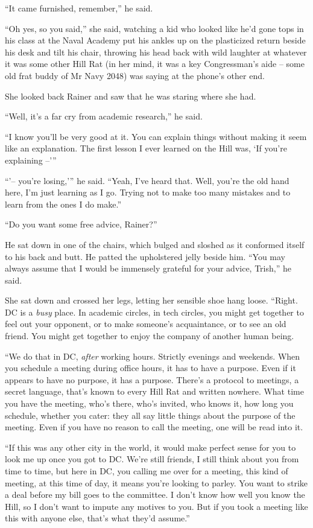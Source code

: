 “It came furnished, remember,” he said.

“Oh yes, so you said,” she said, watching a kid who looked like 
he'd gone tops in his class at the Naval Academy put his ankles up on 
the plasticized return beside his desk and tilt his chair, throwing his 
head back with wild laughter at whatever it was some other Hill Rat (in 
her mind, it was a key Congressman's aide -- some old frat buddy of Mr 
Navy 2048) was saying at the phone's other end.

She looked back  Rainer and saw that he was staring where she had.

“Well, it's a far cry from academic research,” he said.

“I know you'll be very good at it. You can explain things without 
making it seem like an explanation. The first lesson I ever learned on 
the Hill was, `If you're explaining --'”

“'-- you're losing,'” he said. “Yeah, I've heard that. Well, 
you're the old hand here, I'm just learning as I go. Trying not to make 
too many mistakes and to learn from the ones I do make.”

“Do you want some free advice, Rainer?”

He sat down in one of the chairs, which bulged and sloshed as it 
conformed itself to his back and butt. He patted the upholstered jelly 
beside him. “You may always assume that I would be immensely grateful 
for your advice, Trish,” he said.

She sat down and crossed her legs, letting her sensible shoe hang 
loose. “Right. DC is a \emph{busy} place. In academic circles, in 
tech circles, you might get together to feel out your opponent, or to 
make someone's acquaintance, or to see an old friend. You might get 
together to enjoy the company of another human being.

“We do that in DC, \emph{after} working hours. Strictly evenings and 
weekends. When you schedule a meeting during office hours, it has to 
have a purpose. Even if it appears to have no purpose, it has a 
purpose. There's a protocol to meetings, a secret language, that's 
known to every Hill Rat and written nowhere. What time you have the 
meeting, who's there, who's invited, who knows it, how long you 
schedule, whether you cater: they all say little things about the 
purpose of the meeting. Even if you have no reason to call the meeting, 
one will be read into it.

“If this was any other city in the world, it would make perfect sense 
for you to look me up once you got to DC. We're still friends, I still 
think about you from time to time, but here in DC, you calling me over 
for a meeting, this kind of meeting, at this time of day, it means 
you're looking to parley. You want to strike a deal before my bill goes 
to the committee. I don't know how well you know the Hill, so I don't 
want to impute any motives to you. But if you took a meeting like this 
with anyone else, that's what they'd assume.”

